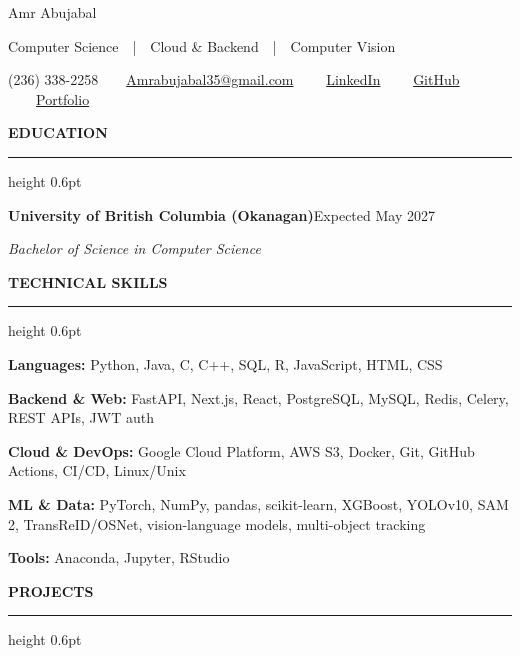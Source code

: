 \documentclass[10pt,letterpaper]{article}
\newcommand{\cvsection}[1]{%
  \vspace{7.5pt}%
  {\fontsize{12}{14}\selectfont\bfseries #1}%
  \par\vspace{2pt}\hrule height 0.6pt\vspace{4pt}%
}
\begin{document}
\begin{center}
  {\fontsize{20}{23}\selectfont Amr Abujabal}\par\vspace{1pt}
  Computer Science~~|~~Cloud \& Backend~~|~~Computer Vision\par\vspace{2pt}
  (236) 338-2258~~\textbullet~~\href{mailto:Amrabujabal35@gmail.com}{Amrabujabal35@gmail.com}%
  ~~\textbullet~~\href{https://www.linkedin.com/in/amr-abujabal-bb63b5195/}{LinkedIn}%
  ~~\textbullet~~\href{https://github.com/AmroAbujabal}{GitHub}%
  ~~\textbullet~~\href{https://amrabujabal.com}{Portfolio}
\end{center}

\cvsection{EDUCATION}

\textbf{University of British Columbia (Okanagan)}\hfill Expected May 2027\par
\textit{Bachelor of Science in Computer Science}

\cvsection{TECHNICAL SKILLS}

\textbf{Languages:} Python, Java, C, C++, SQL, R, JavaScript, HTML, CSS\par\vspace{1pt}
\textbf{Backend \& Web:} FastAPI, Next.js, React, PostgreSQL, MySQL, Redis, Celery, REST APIs, JWT auth\par\vspace{1pt}
\textbf{Cloud \& DevOps:} Google Cloud Platform, AWS S3, Docker, Git, GitHub Actions, CI/CD, Linux/Unix\par\vspace{1pt}
\textbf{ML \& Data:} PyTorch, NumPy, pandas, scikit-learn, XGBoost, YOLOv10, SAM 2, TransReID/\allowbreak OSNet,
vision-language models, multi-object tracking\par\vspace{1pt}
\textbf{Tools:} Anaconda, Jupyter, RStudio

\cvsection{PROJECTS}
\end{document}
